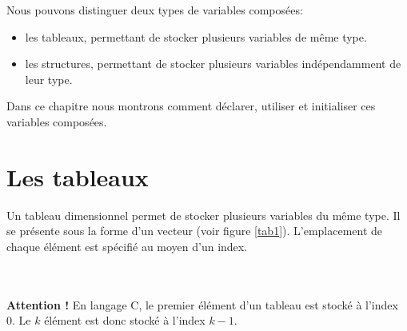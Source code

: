 \documentclass[a4paper,11pt]{book}
\newenvironment{warning} 
   {~\\ \textbf{Attention !}}{\\}
\theoremstyle{definition}
\begin{document}
Nous pouvons distinguer deux types de variables composées:
\begin{itemize}
\item les tableaux,  permettant de stocker plusieurs variables de même type. 
\item les structures, permettant de stocker plusieurs variables indépendamment de leur type.
\end{itemize}
Dans ce chapitre nous montrons comment déclarer, utiliser et initialiser ces variables composées.
\section{Les tableaux}\label{sectiontab}

Un tableau dimensionnel permet de stocker plusieurs variables du même type. Il se présente sous la forme d'un vecteur (voir figure \ref{tab1}). L'emplacement de chaque élément est spécifié au moyen d'un index.\\

\begin{minipage}{.9\linewidth}
\centering
{}
\end{minipage}
~\\

\begin{warning}
En langage C, le premier élément d'un tableau est stocké à l'index 0. Le $k$\ieme{} élément est donc stocké à l'index $k-1$.
\end{warning}
\end{document}

